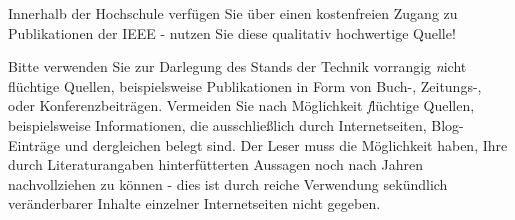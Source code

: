 Innerhalb der Hochschule verfügen Sie über einen kostenfreien Zugang zu Publikationen der IEEE - nutzen Sie diese qualitativ hochwertige Quelle! 

Bitte verwenden Sie zur Darlegung des Stands der Technik vorrangig {\emph nicht flüchtige Quellen}, beispielsweise Publikationen in Form von Buch-, Zeitungs-, oder Konferenzbeiträgen.
Vermeiden Sie nach Möglichkeit {\emph flüchtige Quellen}, beispielsweise Informationen, die ausschließlich durch Internetseiten, Blog-Einträge und dergleichen belegt sind. Der Leser muss die Möglichkeit haben, Ihre durch Literaturangaben hinterfütterten Aussagen noch nach Jahren nachvollziehen zu können - dies ist durch reiche Verwendung sekündlich veränderbarer Inhalte einzelner Internetseiten nicht gegeben.

